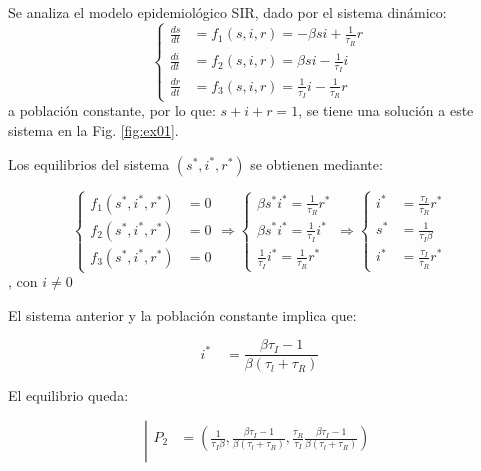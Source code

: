 \documentclass[twocolumn,aps,prl]{revtex4-1}
\begin{document}
Se analiza el modelo epidemiológico SIR, dado por el sistema dinámico:
$$
\left\lbrace
\begin{aligned}
\frac{d s}{d t} & = f_1(s,i,r) = -\beta s i+\frac{1}{\tau_{R}} r \\
\frac{d i}{d t} & = f_2(s,i,r) =\beta s i-\frac{1}{\tau_{I}} i \\
\frac{d r}{d t} & = f_3(s,i,r) =\frac{1}{\tau_{I}} i-\frac{1}{\tau_{R}} r
\end{aligned}
\right.
$$
a población constante, por lo que: $s+i+r =1 $, se tiene una solución a este sistema en la Fig. \ref{fig:ex01}.

Los equilibrios del sistema $\left(s^{*}, i^{*}, r^{*}\right)$ se obtienen mediante:

$$
\left\lbrace
\begin{aligned}
f_1(s^*, i^*, r^*) &= 0  \\
f_2(s^*, i^*, r^*) &= 0  \\
f_3(s^*, i^*, r^*) &= 0
\end{aligned}
\right.
\Rightarrow
\left\lbrace
\begin{aligned}
\beta s^* i^* = \frac{1}{\tau_{R}} r^* \\
\beta s^* i^* = \frac{1}{\tau_{I}} i^* \\
\frac{1}{\tau_{I}} i^* = \frac{1}{\tau_{R}} r^*
\end{aligned}
\right.
\Rightarrow
\left\lbrace
\begin{aligned}
i^* &= \frac{\tau_{I}}{\tau_{R}} r^* \\
s^* &= \frac{1}{\tau_{I} \beta}      \\
i^* &= \frac{\tau_{I}}{\tau_{R}} r^* 
\end{aligned}
\right.
$$, con $i \neq 0$

El sistema anterior y la población constante implica que:

$$
i^{*} \quad=\frac{\beta \tau_{I}-1}{\beta\left(\tau_{l}+\tau_{R}\right)}
$$


El equilibrio queda:

$$
\left\lvert 
\begin{aligned}
    P_2 &= 
    ( \frac{1}{\tau_{I} \beta}  
    , \frac{\beta \tau_{I}-1}{\beta\left(\tau_{l}+\tau_{R}\right)}
    , \frac{\tau_{R}}{\tau_{I}} \frac{\beta \tau_{I}-1}{\beta\left(\tau_{l}+\tau_{R}\right)}
    ) \\ 
\end{aligned} \right.
$$
\end{document}
